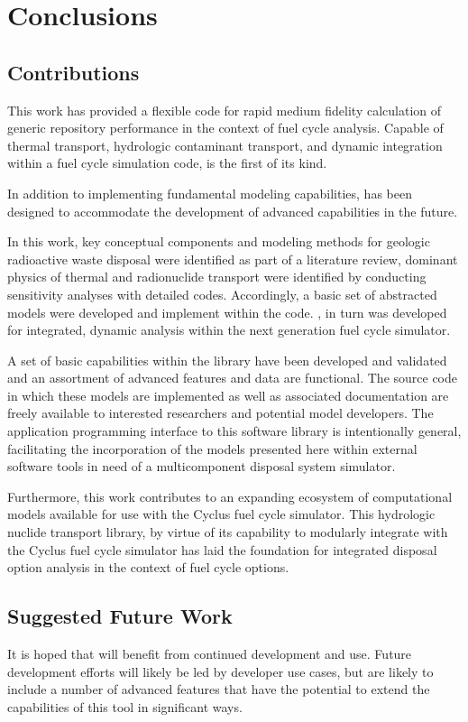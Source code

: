 \chapter{Conclusions}\label{ch:conclusion}
\section{Contributions}

This work has provided a flexible code for rapid medium fidelity calculation of 
generic repository performance in the context of fuel cycle analysis.  Capable 
of thermal transport, hydrologic contaminant transport, and dynamic integration 
within a fuel cycle simulation code, \Cyder is the first of its kind.  

In addition to implementing fundamental modeling capabilities, \Cyder has been 
designed to accommodate the development of advanced capabilities in the future.

In this work, key conceptual components and modeling methods for geologic 
radioactive waste disposal were identified as part of a literature review, 
dominant physics of thermal and radionuclide transport were identified by 
conducting sensitivity analyses with detailed codes. Accordingly, a basic set 
of abstracted models were developed and implement within the \Cyder code. 
\Cyder, in turn was developed for integrated, dynamic analysis within the 
\Cyclus next generation fuel cycle simulator. 

A set of basic capabilities within the \Cyder library have been developed and
validated and an assortment of advanced features and data are functional.
The \Cyder source code in which these models are implemented as well as 
associated documentation are freely available to interested researchers and 
potential model developers. The application programming interface to this 
software library is intentionally general, facilitating the incorporation of 
the models presented here within external software tools in need of a 
multicomponent disposal system simulator. 

Furthermore, this work contributes to an expanding ecosystem of computational 
models available for use with the Cyclus fuel cycle simulator. This hydrologic 
nuclide transport library, by virtue of its capability to modularly integrate 
with the Cyclus fuel cycle simulator has laid the foundation for integrated 
disposal option analysis in the context of fuel cycle options. 

\section{Suggested Future Work}
It is hoped that \Cyder will benefit from continued development and use. Future 
development efforts will likely be led by developer use cases, but are likely 
to include a number of advanced features that have the potential to extend the 
capabilities of this tool in significant ways. 

